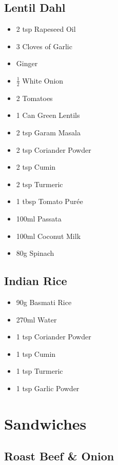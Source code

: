 \documentclass[11pt, english]{article}
\begin{document}
\newpage

	\subsection{Lentil Dahl}

	\begin{itemize}
        \setlength\itemsep{0cm}
                \item 2 tsp Rapeseed Oil
		\item 3 Cloves of Garlic
		\item Ginger
		\item $\frac{1}{2}$ White Onion
		\item 2 Tomatoes
		\item 1 Can Green Lentils
		\item 2 tsp Garam Masala
		\item 2 tsp Coriander Powder
		\item 2 tsp Cumin
		\item 2 tsp Turmeric
		\item 1 tbsp Tomato Pur\'{e}e
		\item 100ml Passata
		\item 100ml Coconut Milk
		\item 80g Spinach
        \end{itemize}

\newpage

	\subsection{Indian Rice}

	\begin{itemize}
	\setlength\itemsep{0cm}
		\item 90g Basmati Rice
		\item 270ml Water
		\item 1 tsp Coriander Powder
		\item 1 tsp Cumin
		\item 1 tsp Turmeric
		\item 1 tsp Garlic Powder
	\end{itemize}

\newpage

\section{Sandwiches}

	\subsection{Roast Beef \& Onion}
\end{document}

